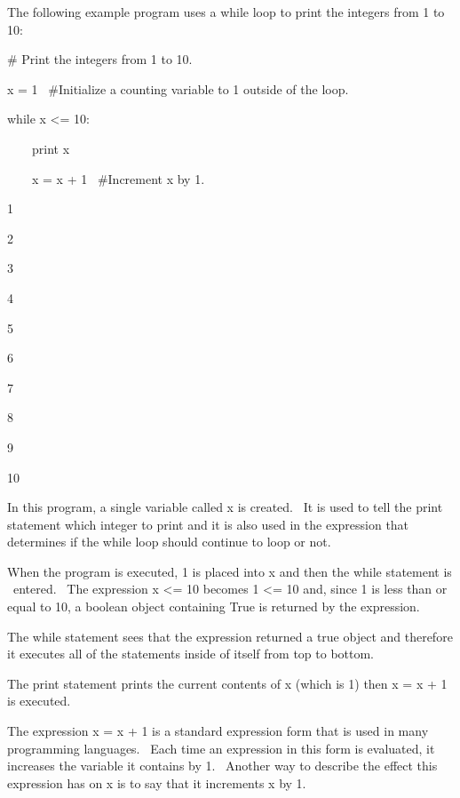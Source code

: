 \documentclass[12pt,twoside]{book}
\begin{document}
\bigskip

The following example program uses a while loop to print the integers
from 1 to 10:


\bigskip

\# Print the integers from 1 to 10.


\bigskip

x = 1 \ \#Initialize a counting variable to 1 outside of the loop.


\bigskip

while x {\textless}= 10:

\ \ \ \ print x

\ \ \ \ x = x + 1 \ \#Increment x by 1.

{\textbar}

1

2

3

4

5

6

7

8

9

10

In this program, a single variable called x is created. \ It is used to
tell the print statement which integer to print and it is also used in
the expression that determines if the while loop should continue to
loop or not.


\bigskip

When the program is executed, 1 is placed into x and then the while
statement is \ entered. \ The expression x {\textless}= 10 becomes 1
{\textless}= 10 and, since 1 is less than or equal to 10, a boolean
object containing True is returned by the expression.


\bigskip

The while statement sees that the expression returned a true object and
therefore it executes all of the statements inside of itself from top
to bottom. \ 


\bigskip

The print statement prints the current contents of x (which is 1) then x
= x + 1 is executed. \ 


\bigskip

The expression x = x + 1 is a standard expression form that is used in
many programming languages. \ Each time an expression in this form is
evaluated, it increases the variable it contains by 1. \ Another way to
describe the effect this expression has on x is to say that it
increments x by 1.
\end{document}
